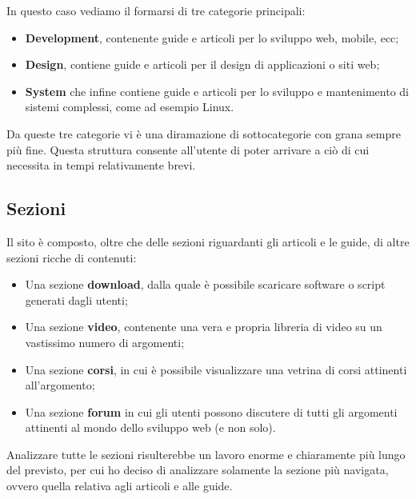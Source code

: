 In questo caso vediamo il formarsi di tre categorie principali:

\begin{itemize}

\item \textbf{Development}, contenente guide e articoli per lo sviluppo web, mobile, ecc;
\item \textbf{Design}, contiene guide e articoli per il design di applicazioni o siti web;
\item \textbf{System} che infine contiene guide e articoli per lo sviluppo e mantenimento di sistemi complessi, come ad esempio Linux.

\end{itemize}

Da queste tre categorie vi è una diramazione di sottocategorie con grana sempre più fine. Questa struttura consente all'utente di poter arrivare a ciò di cui necessita in tempi relativamente brevi.

\subsection{Sezioni}

Il sito è composto, oltre che delle sezioni riguardanti gli articoli e le guide, di altre sezioni ricche di contenuti:

\begin{itemize}

\item Una sezione \textbf{download}, dalla quale è possibile scaricare software o script generati dagli utenti;
\item Una sezione \textbf{video}, contenente una vera e propria libreria di video su un vastissimo numero di argomenti;
\item Una sezione \textbf{corsi}, in cui è possibile visualizzare una vetrina di corsi attinenti all'argomento;
\item Una sezione \textbf{forum} in cui gli utenti possono discutere di tutti gli argomenti attinenti al mondo dello sviluppo web (e non solo).

\end{itemize}

Analizzare tutte le sezioni risulterebbe un lavoro enorme e chiaramente più lungo del previsto, per cui ho deciso di analizzare solamente la sezione più navigata, ovvero quella relativa agli articoli e alle guide.